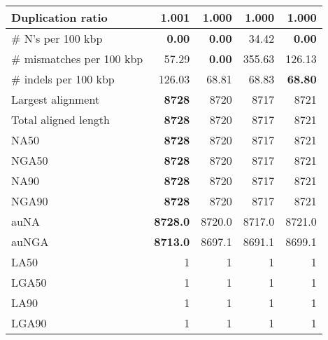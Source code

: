 \documentclass[12pt,a4paper]{article}
\begin{document}
\begin{table}[ht]
\begin{center}
\begin{tabular}{|l*{4}{|r}|}
Duplication ratio & 1.001 & {\bf 1.000} & {\bf 1.000} & {\bf 1.000} \\ \hline
\# N's per 100 kbp & {\bf 0.00} & {\bf 0.00} & 34.42 & {\bf 0.00} \\ \hline
\# mismatches per 100 kbp & 57.29 & {\bf 0.00} & 355.63 & 126.13 \\ \hline
\# indels per 100 kbp & 126.03 & 68.81 & 68.83 & {\bf 68.80} \\ \hline
Largest alignment & {\bf 8728} & 8720 & 8717 & 8721 \\ \hline
Total aligned length & {\bf 8728} & 8720 & 8717 & 8721 \\ \hline
NA50 & {\bf 8728} & 8720 & 8717 & 8721 \\ \hline
NGA50 & {\bf 8728} & 8720 & 8717 & 8721 \\ \hline
NA90 & {\bf 8728} & 8720 & 8717 & 8721 \\ \hline
NGA90 & {\bf 8728} & 8720 & 8717 & 8721 \\ \hline
auNA & {\bf 8728.0} & 8720.0 & 8717.0 & 8721.0 \\ \hline
auNGA & {\bf 8713.0} & 8697.1 & 8691.1 & 8699.1 \\ \hline
LA50 & 1 & 1 & 1 & 1 \\ \hline
LGA50 & 1 & 1 & 1 & 1 \\ \hline
LA90 & 1 & 1 & 1 & 1 \\ \hline
LGA90 & 1 & 1 & 1 & 1 \\ \hline
\end{tabular}
\end{center}
\end{table}
\end{document}
